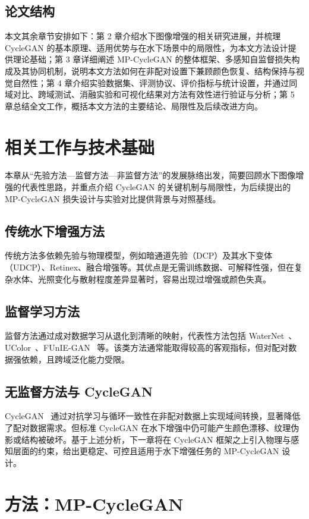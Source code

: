 \documentclass[a4paper,zihao=-4,linespread=1.25]{ctexart}
\begin{document}
\subsection{论文结构}
本文其余章节安排如下：第 2 章介绍水下图像增强的相关研究进展，并梳理 CycleGAN 的基本原理、适用优势与在水下场景中的局限性，为本文方法设计提供理论基础；第 3 章详细阐述 MP-CycleGAN 的整体框架、多感知自监督损失构成及其协同机制，说明本文方法如何在非配对设置下兼顾颜色恢复、结构保持与视觉自然性；第 4 章介绍实验数据集、评测协议、评价指标与统计设置，并通过同域对比、跨域测试、消融实验和可视化结果对方法有效性进行验证与分析；第 5 章总结全文工作，概括本文方法的主要结论、局限性及后续改进方向。

\section{相关工作与技术基础}

本章从“先验方法—监督方法—非监督方法”的发展脉络出发，简要回顾水下图像增强的代表性思路，并重点介绍 CycleGAN 的关键机制与局限性，为后续提出的 MP-CycleGAN 损失设计与实验对比提供背景与对照基线。

\subsection{传统水下增强方法}
传统方法多依赖先验与物理模型，例如暗通道先验（DCP）及其水下变体（UDCP）、Retinex、融合增强等。其优点是无需训练数据、可解释性强，但在复杂水体、光照变化与散射程度差异显著时，容易出现过增强或颜色失真。

\subsection{监督学习方法}
监督方法通过成对数据学习从退化到清晰的映射，代表性方法包括 WaterNet~\cite{1}、UColor~\cite{3}、FUnIE-GAN~\cite{2} 等。该类方法通常能取得较高的客观指标，但对配对数据强依赖，且跨域泛化能力受限。

\subsection{无监督方法与 CycleGAN}
CycleGAN~\cite{4} 通过对抗学习与循环一致性在非配对数据上实现域间转换，显著降低了配对数据需求。但标准 CycleGAN 在水下增强中仍可能产生颜色漂移、纹理伪影或结构被破坏。基于上述分析，下一章将在 CycleGAN 框架之上引入物理与感知层面的约束，给出更稳定、可控且适用于水下增强任务的 MP-CycleGAN 设计。

\section{方法：MP-CycleGAN}
\end{document}
